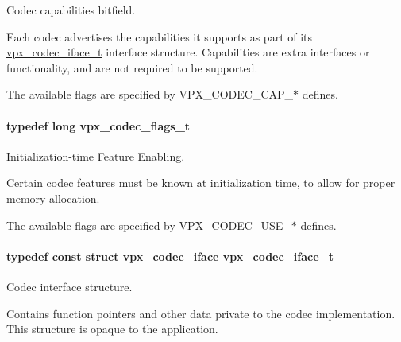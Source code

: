 Codec capabilities bitfield. 

Each codec advertises the capabilities it supports as part of its \hyperlink{group__codec_gae99c3b04f4a567a311211cce3ae6b83b}{vpx\+\_\+codec\+\_\+iface\+\_\+t} interface structure. Capabilities are extra interfaces or functionality, and are not required to be supported.

The available flags are specified by V\+P\+X\+\_\+\+C\+O\+D\+E\+C\+\_\+\+C\+A\+P\+\_\+$\ast$ defines. 
\paragraph[{\texorpdfstring{vpx\+\_\+codec\+\_\+flags\+\_\+t}{vpx_codec_flags_t}}]{\setlength{\rightskip}{0pt plus 5cm}typedef long {\bf vpx\+\_\+codec\+\_\+flags\+\_\+t}}\hypertarget{group__codec_ga3b36d5af89ddc463489fe5bde0a57877}{}\label{group__codec_ga3b36d5af89ddc463489fe5bde0a57877}


Initialization-\/time Feature Enabling. 

Certain codec features must be known at initialization time, to allow for proper memory allocation.

The available flags are specified by V\+P\+X\+\_\+\+C\+O\+D\+E\+C\+\_\+\+U\+S\+E\+\_\+$\ast$ defines. 
\paragraph[{\texorpdfstring{vpx\+\_\+codec\+\_\+iface\+\_\+t}{vpx_codec_iface_t}}]{\setlength{\rightskip}{0pt plus 5cm}typedef const struct vpx\+\_\+codec\+\_\+iface {\bf vpx\+\_\+codec\+\_\+iface\+\_\+t}}\hypertarget{group__codec_gae99c3b04f4a567a311211cce3ae6b83b}{}\label{group__codec_gae99c3b04f4a567a311211cce3ae6b83b}


Codec interface structure. 

Contains function pointers and other data private to the codec implementation. This structure is opaque to the application. 
